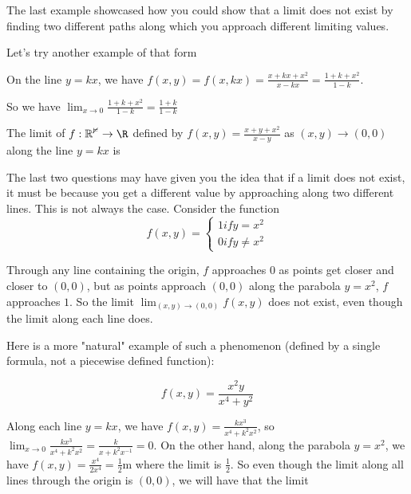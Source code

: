 \documentclass{ximera}
\begin{document}
	The last example showcased how you could show that a limit does not exist by finding two different paths along which you approach different limiting values.  
	
	Let's try another example of that form
	
	\begin{question}
		
	\begin{solution}
	\begin{hint}
		On the line $y=kx$, we have $f(x,y) = f(x,kx) = \frac{x+kx+x^2}{x-kx}  = \frac{1+k+x^2}{1-k }$.
	\end{hint}
	\begin{hint}
		So we have  $\lim_{x \to 0} \frac{1+k+x^2}{1-k} = \frac{1+k}{1-k}$ 
	\end{hint}
		The limit of $f: \mathbb{R^2} \to \R$ defined by $f(x,y) = \frac{x+y+x^2}{x-y}$ as $(x,y) \to (0,0)$ along the line $y=kx$ is 
	\end{solution}		
	\end{question}
	
	The last two questions may have given you the idea that if a limit does not exist, it must be because you get a different value by approaching along two different lines.  
	This is not always the case.  Consider the function
	\[f(x,y) = \begin{cases}
			1 if y = x^2\\
			0 if y \neq x^2
		 \end{cases}\]
		 
	Through any line containing the origin, $f$ approaches $0$ as points get closer and closer to $(0,0)$, but as points approach $(0,0)$ along the parabola 
	$y=x^2$, $f$ approaches $1$.  So the limit $\lim_{(x,y) \to (0,0)} f(x,y)$ does not exist, even though the limit along each line does.
	
	Here is a more "natural" example of such a phenomenon (defined by a single formula, not a piecewise defined function):
	
	\[
		f(x,y) = \frac{x^2y}{x^4+y^2}
	\]
	
	Along each line $y = kx$, we have $f(x,y) = \frac{kx^3}{x^4+k^2x^2}$, so $\lim_{x \to 0} \frac{kx^3}{x^4+k^2x^2} = \frac{k}{x+k^2x^{-1}} = 0$.  
	On the other hand, along the parabola $y=x^2$, we have $f(x,y) = \frac{x^4}{2x^4} = \frac{1}{2}$m where the limit is $\frac{1}{2}$.  So even though the limit
	along all lines through the origin is $(0,0)$, we will have that the limit 
	
	
	
	
	
	
\end{document}
